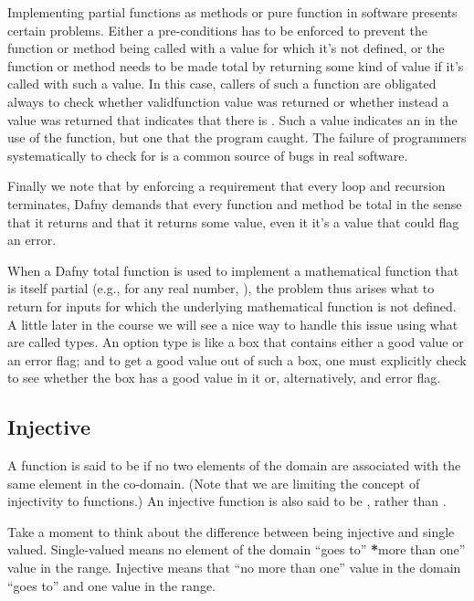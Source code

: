 \documentclass[letterpaper,10pt,english]{sphinxmanual}
\begin{document}
Implementing partial functions as methods or pure function in software
presents certain problems. Either a pre-conditions has to be enforced
to prevent the function or method being called with a value for which
it’s not defined, or the function or method needs to be made total by
returning some kind of  value if it’s called with such a value.
In this case, callers of such a function are obligated always to check
whether  validfunction value was returned or whether instead a
value was returned that indicates that there is . Such
a value indicates an  in the use of the function, but one that
the program caught. The failure of programmers systematically to check
for  is a common source of bugs in real software.

Finally we note that by enforcing a requirement that every loop and
recursion terminates, Dafny demands that every function and method be
total in the sense that it returns and that it returns some value,
even it it’s a value that could flag an error.

When a Dafny total function is used to implement a mathematical
function that is itself partial (e.g.,  for any real number,
), the problem thus arises what to return for inputs for which the
underlying mathematical function is not defined.  A little later in
the course we will see a nice way to handle this issue using what are
called  types. An option type is like a box that contains
either a good value or an error flag; and to get a good value out of
such a box, one must explicitly check to see whether the box has a
good value in it or, alternatively, and error flag.


\subsection{Injective}
\label{\detokenize{07-set-theory:injective}}
A function is said to be  if no two elements of the domain
are associated with the same element in the co-domain. (Note that we
are limiting the concept of injectivity to functions.) An injective
function is also said to be , rather than .

Take a moment to think about the difference between being injective
and single valued. Single-valued means no  element of the domain
“goes to” {\color{red}\bfseries{}*}more than one” value in the range. Injective means that “no
more than one” value in the domain “goes to” and one value in the
range.
\end{document}
